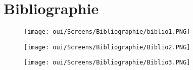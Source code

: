 \chapter*{Bibliographie}
\label{chap:Mini Projet}

\begin{figure}[htp!]
  \centering
  \setlength\figureheight{7cm}
  \setlength\figurewidth{9cm}
    \texttt{[image: oui/Screens/Bibliographie/biblio1.PNG]}
  \label{fig:courbe-tikz}
\end{figure}

\newpage
\begin{figure}[htp!]
  \centering
  \setlength\figureheight{7cm}
  \setlength\figurewidth{9cm}
    \texttt{[image: oui/Screens/Bibliographie/Biblio2.PNG]}
  \label{fig:courbe-tikz}
\end{figure}

\newpage
\begin{figure}[htp!]
  \centering
  \setlength\figureheight{7cm}
  \setlength\figurewidth{9cm}
    \texttt{[image: oui/Screens/Bibliographie/Biblio3.PNG]}
  \label{fig:courbe-tikz}
\end{figure}